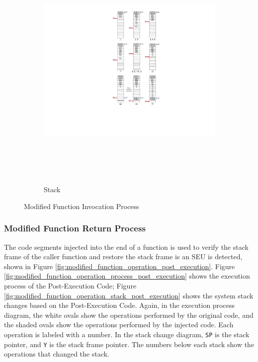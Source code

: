 \begin{figure}
\begin{subfigure}[b]{0.5\columnwidth}
                \includegraphics[width=\textwidth, height=12cm]{figures/modified_function_operations_stack_pre_execution_v1}
                \caption{Stack}
                \label{fig:modified_function_operation_stack_pre_execution}
        \end{subfigure}
        \caption{Modified Function Invocation Process}\label{fig:modified_function_operation_pre_execution}
\end{figure}

\subsubsection{Modified Function Return Process}

The code segments injected into the end of a function is used to verify the stack frame of the caller function and restore the stack frame is an SEU is detected, shown in Figure \ref{fig:modified_function_operation_post_execution}. Figure \ref{fig:modified_function_operation_process_post_execution} shows the execution process of the Post-Execution Code; Figure \ref{fig:modified_function_operation_stack_post_execution} shows the system stack changes based on the Post-Execution Code. Again, in the execution process diagram, the white ovals show the operations performed by the original code, and the shaded ovals show the operations performed by the injected code. Each operation is labeled with a number. In the stack change diagram, \texttt{SP} is the stack pointer, and \texttt{Y} is the stack frame pointer. The numbers below each stack show the operations that changed the stack.

